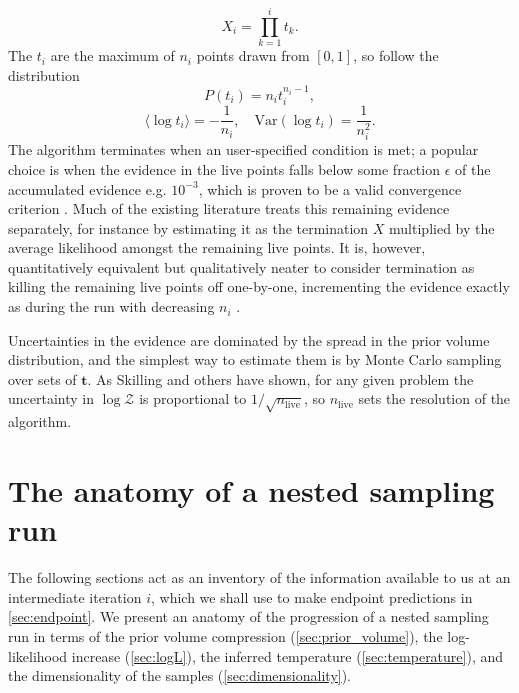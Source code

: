 \documentclass[usenatbib]{mnras}
\newcommand{\nlive}{n_i}
\begin{document}
\begin{equation}\label{eq:X_dist}
	X_i = \prod_{k=1}^i t_k.
\end{equation}
The $t_i$ are the maximum of $\nlive$ points drawn from $[0,1]$, so follow the distribution
\begin{equation}\label{eq:t_dist}
	P(t_i) = \nlive t_i^{\nlive-1},
\end{equation}
\begin{equation}\label{eq:t_moments}
    \langle\log t_i\rangle = -\frac{1}{\nlive}, \quad \mathrm{Var}(\log t_i) = \frac{1}{\nlive^2}.
\end{equation}
The algorithm terminates when an user-specified condition is met; a popular choice is when the evidence in the live points falls below some fraction $\epsilon$ of the accumulated evidence e.g. $10^{-3}$, which is proven to be a valid convergence criterion \citep{evans, Chopin_2010}.
Much of the existing literature treats this remaining evidence separately, for instance by estimating it as the termination $X$ multiplied by the average likelihood amongst the remaining live points. It is, however, quantitatively equivalent but qualitatively neater to consider termination as killing the remaining live points off one-by-one, incrementing the evidence exactly as during the run with decreasing $\nlive$ \citep{dynesty}.
\par
Uncertainties in the evidence are dominated by the spread in the prior volume distribution, and the simplest way to estimate them is by Monte Carlo sampling over sets of $\bm{t}$. As Skilling and others \citep{Chopin_2010, Keeton_2011} have shown, for any given problem the uncertainty in $\log \mathcal{Z}$ is proportional to $1/\sqrt{n_\mathrm{live}}$, so $n_\mathrm{live}$ sets the resolution of the algorithm.   

\section{The anatomy of a nested sampling run}\label{sec:anatomy}
The following sections act as an inventory of the information available to us at an intermediate iteration $i$, which we shall use to make endpoint predictions in \cref{sec:endpoint}. We present an anatomy of the progression of a nested sampling run in terms of the prior volume compression (\cref{sec:prior_volume}), the log-likelihood increase (\cref{sec:logL}), the inferred temperature (\cref{sec:temperature}), and the dimensionality of the samples (\cref{sec:dimensionality}).
\end{document}
